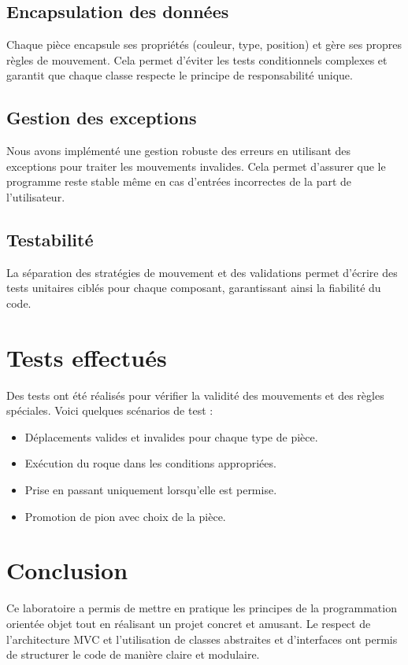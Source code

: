 \documentclass[12pt]{report}
\begin{document}
    \subsection*{Encapsulation des données}
    Chaque pièce encapsule ses propriétés (couleur, type, position) et gère ses propres règles de mouvement. Cela permet d'éviter les tests conditionnels complexes et garantit que chaque classe respecte le principe de responsabilité unique.

    \subsection*{Gestion des exceptions}
    Nous avons implémenté une gestion robuste des erreurs en utilisant des exceptions pour traiter les mouvements invalides. Cela permet d'assurer que le programme reste stable même en cas d'entrées incorrectes de la part de l'utilisateur.

    \subsection*{Testabilité}
    La séparation des stratégies de mouvement et des validations permet d'écrire des tests unitaires ciblés pour chaque composant, garantissant ainsi la fiabilité du code.


    \section*{Tests effectués}
    Des tests ont été réalisés pour vérifier la validité des mouvements et des règles spéciales. Voici quelques scénarios de test :
    \begin{itemize}
        \item Déplacements valides et invalides pour chaque type de pièce.
        \item Exécution du roque dans les conditions appropriées.
        \item Prise en passant uniquement lorsqu'elle est permise.
        \item Promotion de pion avec choix de la pièce.
    \end{itemize}



    \section*{Conclusion}
    Ce laboratoire a permis de mettre en pratique les principes de la programmation orientée objet tout en réalisant un projet concret et amusant. Le respect de l'architecture MVC et l'utilisation de classes abstraites et d'interfaces ont permis de structurer le code de manière claire et modulaire.
\end{document}
